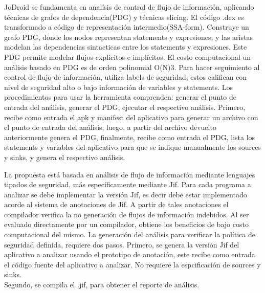 JoDroid se fundamenta en analísis de control de flujo de información, aplicando
técnicas de grafos de dependencia(PDG) y técnicas slicing.\newline 
El código .dex es transformado a código de representación intermedio(SSA-form).
Construye un grafo PDG, donde los nodos representan statements y expresiones, y
las aristas modelan las dependencias sintacticas entre los statements y
expresiones. Este PDG permite modelar flujos explícitos e implícitos.\newline
El costo computacional un análisis basado en PDG es de orden polinomial
O(N)3\cite[page 3]{FCO-PDG}.\newline 
Para hacer seguimiento al control de flujo de información, utiliza labels de
seguridad, estos califican con nivel de seguridad alto o bajo información de
variables y statements.\newline
Los procedimientos para usar la herramienta comprenden: generar el punto de
entrada del análisis, generar el PDG, ejecutar el respectivo análisis. Primero,
recibe como entrada el apk y manifest del aplicativo para generar un archivo con
el punto de entrada del análisis; luego, a partir del archivo devuelto
anteriormente genera el PDG, finalmente, recibe como entrada el PDG, lista los
statements y variables del aplicativo para que se indique manualmente los
sources y sinks, y genera el respectivo análisis.\newline

La propuesta está basada en análisis de flujo de información mediante lenguajes
tipados de seguridad, más específicamente mediante Jif.\newline
Para cada programa a analizar se debe implementar la versión Jif, es decir debe
estar implementado acorde al sistema de anotaciones de Jif. A partir de tales
anotaciones el compilador verifica la no generación de flujos de información
indebidos. Al ser evaluado directamente por un compilador, obtiene los
beneficios de bajo costo computacional del mismo.\newline
La generación del análisis para verificar la política de seguridad
definida, requiere dos pasos. Primero, se genera la versión Jif del aplicativo a
analizar usando el prototipo de anotación, este recibe como entrada el
código fuente del aplicativo a analizar. No requiere la espcificación de sources
y sinks.\\
Segundo, se compila el .jif, para obtener el reporte de análisis.






